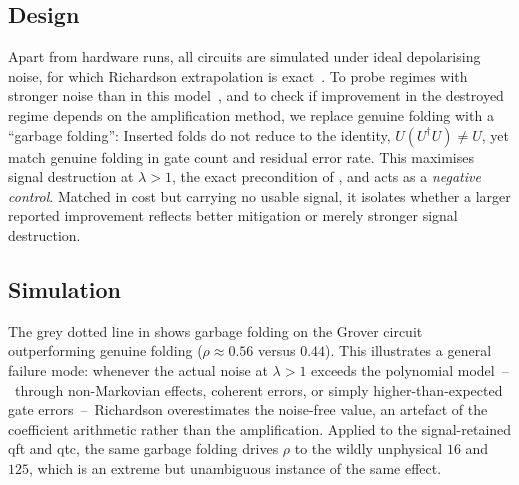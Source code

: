 \documentclass[10pt,conference, letterpaper]{IEEEtran}
\begin{document}
\subsection{Design}
Apart from hardware runs, all circuits are simulated under ideal depolarising noise, for which Richardson extrapolation is exact~\cite{cai_quantum_2023}. To probe regimes with stronger noise than in this model~\cite{maschek_make_2025}, and to check if improvement in the destroyed regime depends on the amplification method, we replace genuine folding with a \enquote{garbage folding}: Inserted folds do not reduce to the identity, $U(U^\dagger U)\neq U$, yet match genuine folding in gate count and residual error rate. This maximises signal destruction at $\lambda>1$, the exact precondition of , and acts as a \emph{negative control}. Matched in cost but carrying no usable signal, it isolates whether a larger reported improvement reflects better mitigation or merely stronger signal destruction.

\subsection{Simulation}
The grey dotted line in  shows garbage folding on the Grover circuit outperforming genuine folding ($\rho\approx0.56$ versus $0.44$). This illustrates a general failure mode: whenever the actual noise at $\lambda>1$ exceeds the polynomial model~--~through non-Markovian effects, coherent errors, or simply higher-than-expected gate errors~--~Richardson overestimates the noise-free value, an artefact of the coefficient arithmetic rather than the amplification. Applied to the signal-retained \gls{qft} and \gls{qtc}, the same garbage folding drives $\rho$ to the wildly unphysical $16$ and $125$, which is an extreme but unambiguous instance of the same effect.
\end{document}

